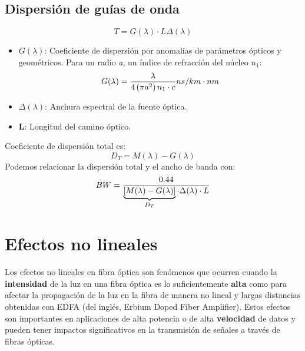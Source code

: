 \documentclass[
	12pt, %
	fleqn, %
	a4paper, %
	oneside, %
]{LegrandOrangeBook}
\begin{document}
\subsection{Dispersión de guías de onda}
\begin{equation}
T=G(\lambda)\cdot L\Delta(\lambda)
\end{equation}
\begin{itemize}
\item $G(\lambda)$: Coeficiente de dispersión por anomalías de parámetros ópticos y geométricos. Para un radio \textit{a}, un índice de refracción del núcleo $n_1$:
\begin{displaymath}
G(\lambda)=\frac{\lambda}{4\left(\pi a^2\right)n_1\cdot c}ns/km\cdot nm
\end{displaymath}
\item $\Delta(\lambda)$: Anchura espectral de la fuente óptica.
\item \textbf{L}: Longitud del camino óptico.
\end{itemize}
Coeficiente de dispersión total es:
\begin{equation}
D_T=M(\lambda)-G(\lambda)
\end{equation}
Podemos relacionar la dispersión total y el ancho de banda con:
\begin{equation}
BW=\frac{0.44}{\underbrace{\left[M(\lambda)-G(\lambda)\right]}_{D_T}\cdot\Delta(\lambda)\cdot L}
\end{equation}
\section{Efectos no lineales}
Los efectos no lineales en fibra óptica son fenómenos que ocurren cuando la \textbf{intensidad} de la luz en una fibra óptica es lo suficientemente \textbf{alta} como para afectar la propagación de la luz en la fibra de manera no lineal y largas distancias obtenidas con EDFA (del inglés, Erbium Doped Fiber Amplifier). Estos efectos son importantes en aplicaciones de alta potencia o de alta \textbf{velocidad} de datos y pueden tener impactos significativos en la transmisión de señales a través de fibras ópticas.
\end{document}
